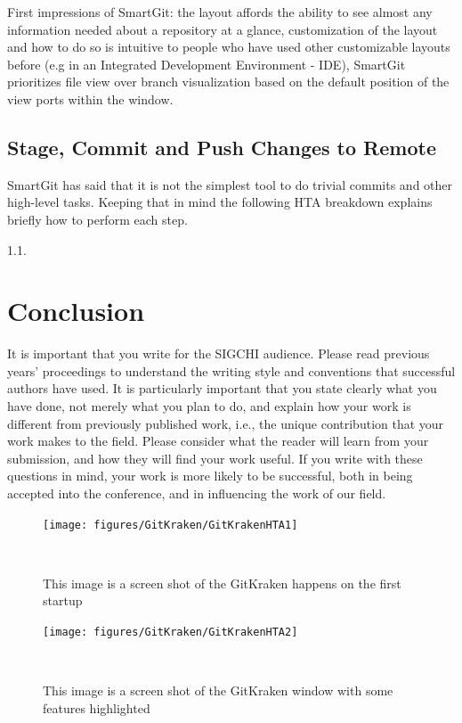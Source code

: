 \documentclass{sigchi}
\begin{document}
First impressions of SmartGit: the layout affords the ability to see almost any information needed about a repository at a glance,
customization of the layout and how to do so is intuitive to people who have used other customizable layouts before
(e.g in an Integrated Development Environment - IDE), SmartGit prioritizes file view over branch visualization based on the 
default position of the view ports within the window. 

\subsection{Stage, Commit and Push Changes to Remote}
SmartGit has said that it is not the simplest tool to do trivial commits and other high-level tasks.
Keeping that in mind the following HTA breakdown explains briefly how to perform each step.

1.1. 


\section{Conclusion}
It is important that you write for the SIGCHI audience. Please read
previous years' proceedings to understand the writing style and
conventions that successful authors have used. It is particularly
important that you state clearly what you have done, not merely what
you plan to do, and explain how your work is different from previously
published work, i.e., the unique contribution that your work makes to
the field. Please consider what the reader will learn from your
submission, and how they will find your work useful. If you write with
these questions in mind, your work is more likely to be successful,
both in being accepted into the conference, and in influencing the
work of our field.

\begin{figure}
  \centering
  \texttt{[image: figures/GitKraken/GitKrakenHTA1]}
  \caption{This image is a screen shot of the GitKraken happens on the first startup}~\label{fig:GitKrakenHTA1}
\end{figure}

\begin{figure}
  \centering
  \texttt{[image: figures/GitKraken/GitKrakenHTA2]}
  \caption{This image is a screen shot of the GitKraken window with some features highlighted}~\label{fig:GitKrakenHTA2}
\end{figure}


\balance{}



\end{document}
